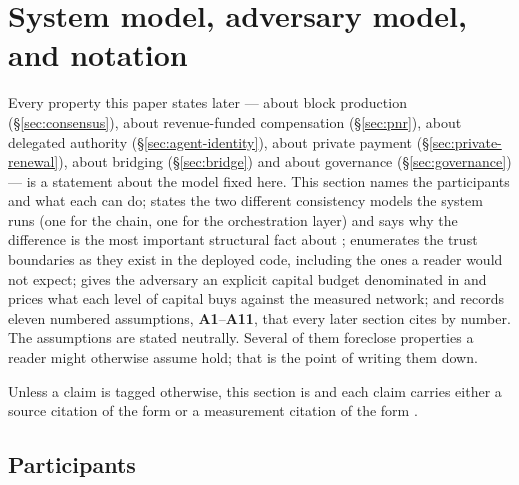 \section{System model, adversary model, and notation}
\label{sec:model}\label{sec:02-system-model}

Every property this paper states later --- about block production (\S\ref{sec:consensus}), about
revenue-funded compensation (\S\ref{sec:pnr}), about delegated authority (\S\ref{sec:agent-identity}),
about private payment (\S\ref{sec:private-renewal}), about bridging (\S\ref{sec:bridge}) and about
governance (\S\ref{sec:governance}) --- is a statement about the model fixed here. This section names
the participants and what each can do; states the two different consistency models the system runs
(one for the chain, one for the orchestration layer) and says why the difference is the most
important structural fact about \Flux; enumerates the trust boundaries as they exist in the deployed
code, including the ones a reader would not expect; gives the adversary an explicit capital budget
denominated in \flux and prices what each level of capital buys against the measured network; and
records eleven numbered assumptions, \textbf{A1}--\textbf{A11}, that every later section cites by
number. The assumptions are stated neutrally. Several of them foreclose properties a reader might
otherwise assume hold; that is the point of writing them down.

Unless a claim is tagged otherwise, this section is \shipped and each claim carries either a source
citation of the form  or a measurement citation of the form
.

\subsection{Participants}
\label{sec:model:participants}

